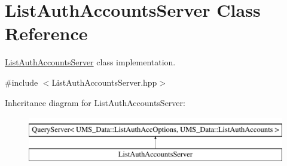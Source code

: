\hypertarget{classListAuthAccountsServer}{
\section{ListAuthAccountsServer Class Reference}
\label{classListAuthAccountsServer}
}


\hyperlink{classListAuthAccountsServer}{ListAuthAccountsServer} class implementation.  




{\ttfamily \#include $<$ListAuthAccountsServer.hpp$>$}

Inheritance diagram for ListAuthAccountsServer:\begin{figure}[H]
\begin{center}
\leavevmode
\includegraphics[height=2.000000cm]{classListAuthAccountsServer}
\end{center}
\end{figure}
